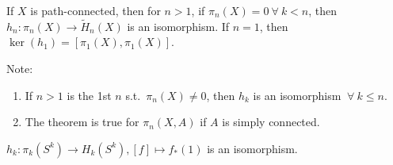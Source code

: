 \documentclass[12pt,class=article,crop=false]{standalone}
\begin{document}
\begin{thm}[Hurewicz]
	If $ X$ is path-connected, then for  $ n > 1$, if  $ \pi_n(X) =0 \ \forall \ k <n$, then $ h_n: \pi_n(X) \to \widetilde{ H}_n(X)$ is an isomorphism. If $ n=1$, then  $ \ker (h_1) = [\pi_1(X),\pi_1(X)] $.
\end{thm}
Note:
\begin{enumerate}[label=(\arabic*)]
	\item If $ n>1$ is the 1st  $ n$  s.t.\ $ \pi_n(X) \neq 0$, then $ h_k$ is an isomorphism $ \ \forall \ k \leq n$.
	\item The theorem is true for $ \pi_n(X,A)$ if $ A$ is simply connected.
\end{enumerate}
\begin{lem}
	$ h_k: \pi_k(S^{k}) \to H_k(S^{k}),[f] \mapsto f_*(1)$ is an isomorphism.
\end{lem}
\end{document}
